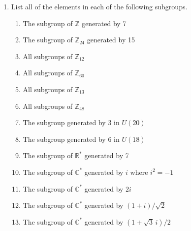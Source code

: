 {\begin{enumerate}
\begin{minipage}[t]{4.6in}
\begin{minipage}[t]{2.25in}
\begin{itemize}
 \item[{\bf (f)}]
312 in ${\mathbb Z}_{471}$
 
\end{itemize}
\end{minipage}
\end{minipage}
 
\vspace{2pt}        %
 
 
\bf\item\rm
List all of the elements in each of the following subgroups.
\begin{enumerate}
 
 \bf\item\rm
The subgroup of ${\mathbb Z}$ generated by 7
 
 \bf\item\rm
The subgroup of ${\mathbb Z}_{24}$ generated by 15
 
 \bf\item\rm
All subgroups of ${\mathbb Z}_{12}$
 
 \bf\item\rm
All subgroups of ${\mathbb Z}_{60}$
 
 \bf\item\rm
All subgroups of ${\mathbb Z}_{13}$
 
 \bf\item\rm
All subgroups of ${\mathbb Z}_{48}$
 
 \bf\item\rm
The subgroup generated by 3  in $U(20)$
 
 \bf\item\rm
The subgroup generated by 6  in $U(18)$
 
 \bf\item\rm
The subgroup of ${\mathbb R}^\ast$ generated by 7
 
 \bf\item\rm
The subgroup of ${\mathbb C}^\ast$ generated by $i$ where $i^2 = -1$
 
 \bf\item\rm
The subgroup of ${\mathbb C}^\ast$ generated by $2i$
 
 \bf\item\rm
The subgroup of ${\mathbb C}^\ast$ generated by $(1 + i) / \sqrt{2}$
 
 \bf\item\rm
The subgroup of ${\mathbb C}^\ast$ generated by $(1 + \sqrt{3}\, i) / 2$
 
\end{enumerate}
 

\end{enumerate}}
